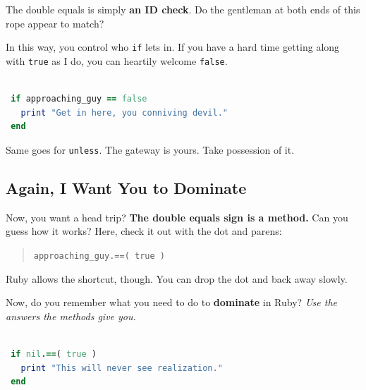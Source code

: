 \documentclass[10pt,twoside]{report}
\begin{document}
The double equals is simply {\bf an ID check}.  Do the gentleman at
both ends of this rope appear to match?

In this way, you control who \lstinline[breaklines=true]|if| lets in.
If you have a hard time getting along with
\lstinline[breaklines=true]|true| as I do, you can heartily welcome
\lstinline[breaklines=true]|false|.


\begin{lstlisting}[basicstyle=\ttfamily\color{basiccolor},
    commentstyle = \ttfamily\color{commentcolor},
    keywordstyle=\ttfamily\color{keywordscolor},
    stringstyle=\color{stringcolor},
    language=Ruby,
    basicstyle=\small\ttfamily,
    showstringspaces=false,
  ]

 if approaching_guy == false 
   print "Get in here, you conniving devil."
 end

\end{lstlisting}


Same goes for \lstinline[breaklines=true]|unless|.  The gateway is
yours.  Take possession of it.



\subsection{Again, I Want You to Dominate}



Now, you want a head trip?  {\bf The double equals sign is a method.}
Can you guess how it works?  Here, check it out with the dot and
parens:

\begin{quote}
\lstinline[breaklines=true]|approaching_guy.==( true )|\end{quote}


Ruby allows the shortcut, though.  You can drop the dot and back away
slowly.

Now, do you remember what you need to do to {\bf dominate} in Ruby?
{\em Use the answers the methods give you.}


\begin{lstlisting}[basicstyle=\ttfamily\color{basiccolor},
    commentstyle = \ttfamily\color{commentcolor},
    keywordstyle=\ttfamily\color{keywordscolor},
    stringstyle=\color{stringcolor},
    language=Ruby,
    basicstyle=\small\ttfamily,
    showstringspaces=false,
  ]

 if nil.==( true )
   print "This will never see realization."  
 end

\end{lstlisting}
\end{document}

